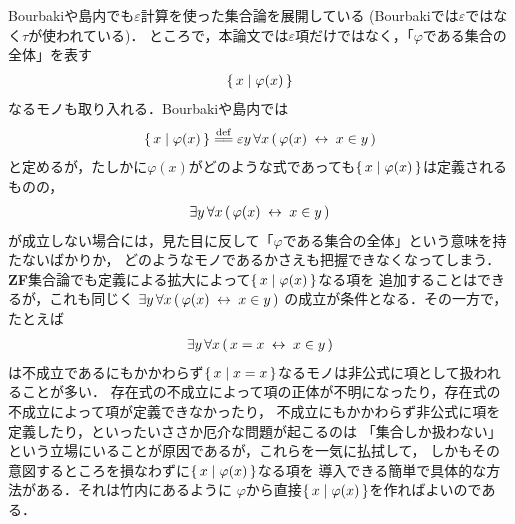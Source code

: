 	Bourbaki\cite{Bourbaki}や島内\cite{Shimauchi}でも$\varepsilon$計算を使った集合論を展開している
	(Bourbaki\cite{Bourbaki}では$\varepsilon$ではなく$\tau$が使われている)．
	ところで，本論文では$\varepsilon$項だけではなく，「$\varphi$である集合の全体」を表す
	\begin{align}
		\{\, x \mid \varphi(x)\, \}
	\end{align}
	なるモノも取り入れる．Bourbaki\cite{Bourbaki}や島内\cite{Shimauchi}では
	\begin{align}
		\Set{x}{\varphi(x)} \defeq \varepsilon y\, \forall x\, 
		(\, \varphi(x) \lrarrow x \in y\, )
	\end{align}
	と定めるが，たしかに$\varphi(x)$がどのような式であっても$\{\, x \mid \varphi(x)\, \}$は定義されるものの，
	\begin{align}
		\exists y\, \forall x\, (\, \varphi(x) \hspace{0.25em}\leftrightarrow\hspace{0.25em} x \in y\, )
	\end{align}
	が成立しない場合には，見た目に反して「$\varphi$である集合の全体」という意味を持たないばかりか，
	どのようなモノであるかさえも把握できなくなってしまう．
	{\bf ZF}集合論でも定義による拡大によって$\{\, x \mid \varphi(x)\, \}$なる項を
	追加することはできるが，これも同じく
	$\exists y\, \forall x\, (\, \varphi(x) \hspace{0.25em}\leftrightarrow\hspace{0.25em} x \in y\, )$
	の成立が条件となる．その一方で，たとえば%
	\begin{align}
		\exists y\, \forall x\, (\, x = x \hspace{0.25em}\leftrightarrow\hspace{0.25em} x \in y\, )
	\end{align}
	は不成立であるにもかかわらず$\{\, x \mid x = x\, \}$なるモノは非公式に項として扱われることが多い．
	存在式の不成立によって項の正体が不明になったり，存在式の不成立によって項が定義できなかったり，
	不成立にもかかわらず非公式に項を定義したり，といったいささか厄介な問題が起こるのは
	「集合しか扱わない」という立場にいることが原因であるが，これらを一気に払拭して，
	しかもその意図するところを損なわずに$\{\, x \mid \varphi(x)\, \}$なる項を
	導入できる簡単で具体的な方法がある．それは竹内\cite{TakeuchiSet}にあるように
	$\varphi$から直接$\{\, x \mid \varphi(x)\, \}$を作ればよいのである．
	
